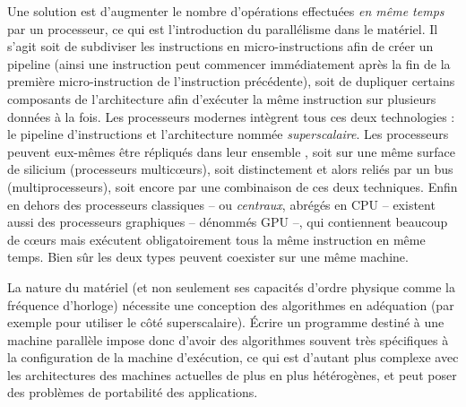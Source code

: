 Une solution est d'augmenter le nombre d'opérations effectuées \emph{en même temps} par un processeur, ce qui est l'introduction du parallélisme dans le matériel.
Il s'agit soit de subdiviser les instructions en  micro-instructions afin de créer un pipeline (ainsi une instruction peut commencer immédiatement après la fin de la première micro-instruction de l'instruction précédente), soit de dupliquer certains composants de l'architecture afin d'exécuter la même instruction sur plusieurs données à la fois. Les processeurs modernes intègrent tous ces deux technologies : le pipeline d'instructions et l'architecture nommée \emph{superscalaire}.
Les processeurs peuvent eux-mêmes être répliqués dans leur ensemble , soit sur une même surface de silicium (processeurs multicœurs), soit distinctement et alors reliés par un bus (multiprocesseurs), soit encore par une combinaison de ces deux techniques.
Enfin en dehors des processeurs classiques -- ou \emph{centraux}, abrégés en CPU -- existent aussi des processeurs graphiques -- dénommés GPU --, qui contiennent beaucoup de cœurs mais exécutent obligatoirement tous la même instruction en même temps. Bien sûr les deux types peuvent coexister sur une même machine.

La nature du matériel (et non seulement ses capacités d'ordre physique comme la fréquence d'horloge) nécessite une conception des algorithmes en adéquation (par exemple pour utiliser le côté superscalaire). 
Écrire un programme destiné à une machine parallèle impose donc d'avoir des algorithmes souvent très spécifiques à la configuration de la machine d'exécution, ce qui est d'autant plus complexe avec les architectures des machines actuelles de plus en plus hétérogènes, et peut poser des problèmes de portabilité des applications.

